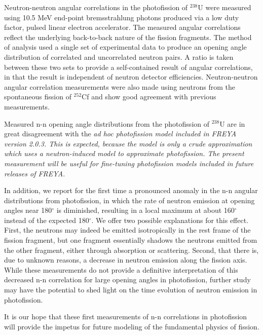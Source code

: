 Neutron-neutron angular correlations in the photofission of $^{238}$U were measured using 10.5 MeV end-point bremsstrahlung photons produced via a low duty factor, pulsed linear electron accelerator.
The measured angular correlations reflect the underlying back-to-back nature of the fission fragments.
The method of analysis used a single set of experimental data to produce an opening angle distribution of correlated and uncorrelated neutron pairs.
A ratio is taken between these two sets to provide a self-contained result of angular correlations, in that the result is independent of neutron detector efficiencies.
Neutron-neutron angular correlation measurements were also made using neutrons from the spontaneous fission of $^{252}$Cf and show good agreement with previous measurements.

Measured n-n opening angle distributions from the photofission of $^{238}$U are in great disagreement with the \it{ad hoc} photofission model included in FREYA version 2.0.3.
This is expected, because the model is only a crude approximation which uses a neutron-induced model to approximate photofission.
The present measurement will be useful for fine-tuning photofission models included in future releases of FREYA.

In addition, we report for the first time a pronounced anomaly in the n-n angular distributions from photofission, in which the rate of neutron emission at opening angles near 180$^{\circ}$ is diminished, resulting in a local maximum at about 160$^{\circ}$ instead of the expected 180$^{\circ}$.
We offer two possible explanations for this effect.
First, the neutrons may indeed be emitted isotropically in the rest frame of the fission fragment, but one fragment essentially shadows the neutrons emitted from the other fragment, either through absorption or scattering.
Second, that there is, due to unknown reasons, a decrease in neutron emission along the fission axis.
While these measurements do not provide a definitive interpretation of this decreased n-n correlation for large opening angles in photofission, further study may have the potential to shed light on the time evolution of neutron emission in photofission.

It is our hope that these first measurements of n-n correlations in photofission will provide the impetus for future modeling of the fundamental physics of fission.

